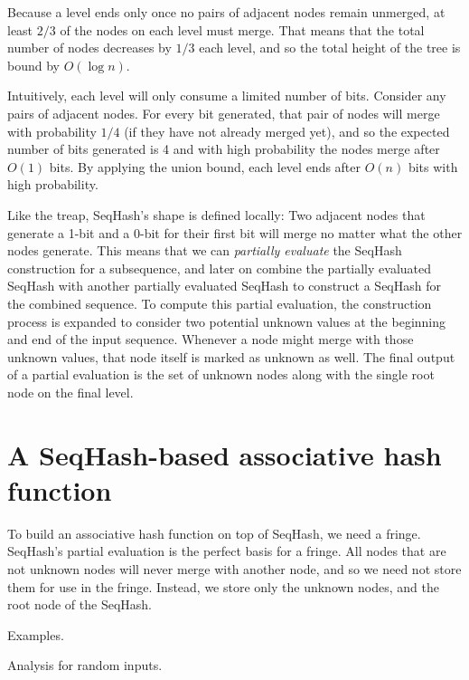 Because a level ends only once no pairs of adjacent nodes remain unmerged,
at least $2/3$ of the nodes on each level must merge. That means that
the total number of nodes decreases by $1/3$ each level, and so the total
height of the tree is bound by $O(\log n)$.

Intuitively, each level will only consume a limited number of bits. Consider
any pairs of adjacent nodes. For every bit generated, that pair of nodes will
merge with probability $1/4$ (if they have not already merged yet), and so the
expected number of bits generated is 4 and with high probability the nodes
merge after $O(1)$ bits. By applying the union bound, each level ends after
$O(n)$ bits with high probability.

Like the treap, SeqHash's shape is defined locally: Two adjacent nodes that
generate a 1-bit and a 0-bit for their first bit will merge no matter what the
other nodes generate. This means that we can \emph{partially evaluate} the
SeqHash construction for a subsequence, and later on combine the partially
evaluated SeqHash with another partially evaluated SeqHash to construct a
SeqHash for the combined sequence. To compute this partial evaluation, the
construction process is expanded to consider two potential unknown values at
the beginning and end of the input sequence. Whenever a node might merge with
those unknown values, that node itself is marked as unknown as well.  The final
output of a partial evaluation is the set of unknown nodes along with the
single root node on the final level.

\section{A SeqHash-based associative hash function}
\label{s:seqhash}

To build an associative hash function on top of SeqHash, we need a fringe.
SeqHash's partial evaluation is the perfect basis for a fringe. All nodes that
are not unknown nodes will never merge with another node, and so we need not
store them for use in the fringe. Instead, we store only the unknown nodes, and
the root node of the SeqHash.

Examples.

Analysis for random inputs.
